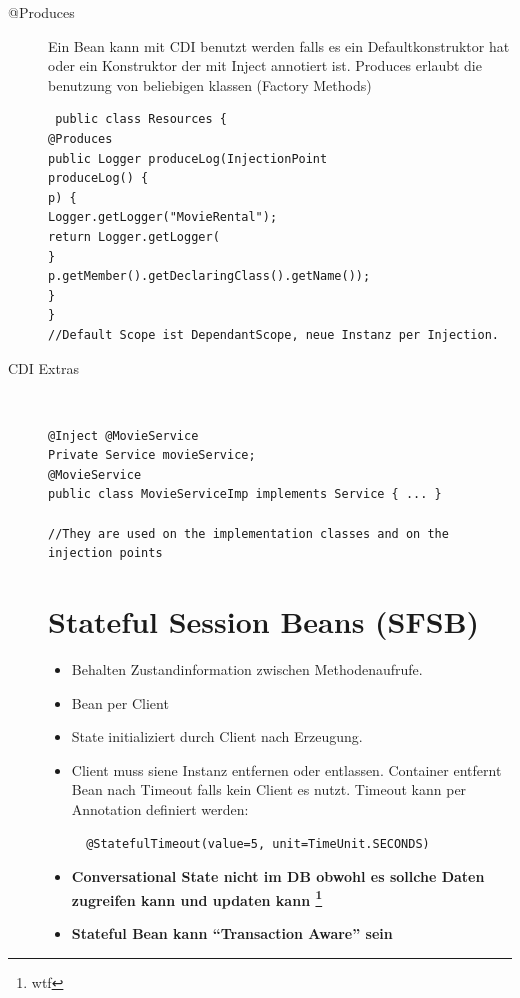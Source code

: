 \documentclass[a4paper,10pt]{scrreprt}
\begin{document}
\begin{description}
 \item [@Produces] Ein Bean kann mit CDI benutzt werden falls es ein Defaultkonstruktor hat oder ein Konstruktor der 
mit Inject annotiert ist.
Produces erlaubt die benutzung von beliebigen klassen (Factory Methods)

\begin{lstlisting}
 public class Resources {
@Produces
public Logger produceLog(InjectionPoint
produceLog() {
p) {
Logger.getLogger("MovieRental");
return Logger.getLogger(
}
p.getMember().getDeclaringClass().getName());
}
}
//Default Scope ist DependantScope, neue Instanz per Injection.
\end{lstlisting}

\item[CDI Extras] \hfill \\
\begin{lstlisting}[caption=CDI mit Qualifier]
 @Inject @MovieService
Private Service movieService;
@MovieService
public class MovieServiceImp implements Service { ... }

//They are used on the implementation classes and on the injection points

\end{lstlisting}

\chapter{Stateful Session Beans (SFSB)}
\begin{itemize}
 \item Behalten Zustandinformation zwischen Methodenaufrufe.
 \item Bean per Client
 \item State initializiert durch Client nach Erzeugung.
 \item Client muss siene Instanz entfernen oder entlassen.
 \subitem Container entfernt Bean nach Timeout falls kein Client es nutzt.
 \subitem Timeout kann per Annotation definiert werden: \\
 \begin{verbatim}
  @StatefulTimeout(value=5, unit=TimeUnit.SECONDS)
 \end{verbatim}
\item \textbf{Conversational State nicht im DB obwohl es sollche Daten zugreifen kann und updaten kann \footnote{wtf}}
\item \textbf{Stateful Bean kann ``Transaction Aware'' sein}
\end{itemize}

\end{description}
\end{document}
